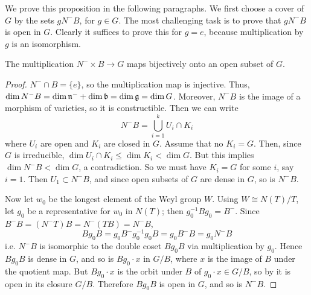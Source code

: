 We prove this proposition in the following paragraphs. We first choose a cover of $G$ by the sets $g N^{-} B$, for 
$g \in G$.
The most challenging task is to prove that $g N^{-}B$ is open in $G$. Clearly it suffices to prove this for $g=e$,
because multiplication by $g$ is an isomorphism.

\begin{lemma}
The multiplication $N^- \times B \to G$ maps bijectively onto an open subset of $G$. 
\end{lemma}
\begin{proof}
$N^- \cap B = \{e\}$, so the multiplication map is injective. Thus, $\dim N^-B = \dim \mathfrak n^- + \dim \mathfrak b
= \dim \mathfrak g = \dim G$. Moreover, $N^- B$ is the image of a morphism of varieties, so it is constructible.  Then we can write
\[	N^-B = \bigcup_{i=1}^k U_i \cap K_i	\]
where $U_i$ are open and $K_i$ are closed in $G$. Assume that no $K_i = G$. Then, since $G$ is irreducible, $\dim U_i \cap
K_i \leq \dim K_i < \dim G$.  But this implies $\dim N^-B < \dim G$, a 
contradiction. So we must have $K_i = G$ for some $i$, say $i=1$. Then $U_1 \subset N^-B$, 
and since open subsets of $G$ are dense in $G$, so is $N^-B$.

Now let $w_0$ be the longest element of the Weyl group $W$. Using $W \cong N(T)/T$, let $g_0$ be a representative
for $w_0$ in $N(T)$; then $g_0^{-1} B g_0 =B^-$. Since $B^- B = (N^- T)B = N^-(TB) = N^- B$,
\[	Bg_0B = g_0 B^- g_0^{-1} g_0 B = g_0 B^- B = g_0 N^- B	\]
i.e. $N^- B$ is isomorphic to the double coset $Bg_0 B$ via multiplication by $g_0$. Hence $Bg_0 B$ is dense in $G$,
and so is $B g_0 \cdot x$ in $G/B$, where $x$ is the image of $B$ under the quotient map. But $B g_0 \cdot x$ is
the orbit under $B$ of $g_0 \cdot x \in G/B$, so by  it is open in its closure
$G/B$. Therefore $Bg_0 B$ is open in $G$, and so is $N^- B$.
\end{proof}

